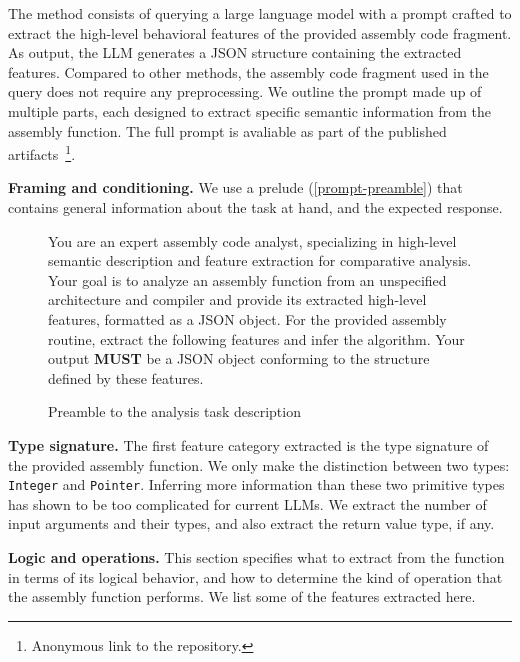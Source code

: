 The method consists of querying a large language model with a prompt crafted to extract the high-level behavioral features of
the provided assembly code fragment. As output, the LLM generates a JSON structure containing the extracted features.
Compared to other methods, the assembly code fragment used in the query does not require any preprocessing.
We outline the prompt made up of multiple parts, each designed to extract specific semantic information from the
assembly function. The full prompt is avaliable as part of the published artifacts~\footnote{Anonymous link to the repository.}.

\noindent \textbf{Framing and conditioning.}
We use a prelude (\autoref{prompt-preamble}) that contains general information about the task at hand, and the expected response.

\begin{figure}
\centering
\begin{tcolorbox}[enhanced]
You are an expert assembly code analyst, specializing in high-level semantic description and feature extraction for comparative
analysis. Your goal is to analyze an assembly function from an unspecified architecture and compiler and provide its extracted
high-level features, formatted as a JSON object. For the provided assembly routine, extract the following features and infer the
algorithm. Your output \textbf{MUST} be a JSON object conforming to the structure defined by these features.
\end{tcolorbox}
\caption{Preamble to the analysis task description}
\label{prompt-preamble}
\end{figure}

\noindent \textbf{Type signature.}
The first feature category extracted is the type signature of the provided assembly function.
We only make the distinction between two types: \texttt{Integer} and \texttt{Pointer}. Inferring more information than these two 
primitive types has shown to be too complicated for current LLMs. We extract the number of input arguments
and their types, and also extract the return value type, if any.

\noindent \textbf{Logic and operations.}
This section specifies what to extract from the function in terms of its logical behavior, and how to determine the kind of
operation that the assembly function performs. We list some of the features extracted here.

